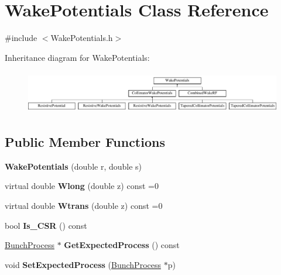 \hypertarget{classWakePotentials}{}\section{Wake\+Potentials Class Reference}
\label{classWakePotentials}


{\ttfamily \#include $<$Wake\+Potentials.\+h$>$}

Inheritance diagram for Wake\+Potentials\+:\begin{figure}[H]
\begin{center}
\leavevmode
\includegraphics[height=1.898305cm]{classWakePotentials}
\end{center}
\end{figure}
\subsection*{Public Member Functions}
\begin{DoxyCompactItemize}
\item 
\mbox{\label{classWakePotentials_a8a60c2f4a9e7edd4d92ce08b572a2534}} 
{\bfseries Wake\+Potentials} (double r, double s)
\item 
\mbox{\label{classWakePotentials_aa016a1abfdb88720c1342572a630271d}} 
virtual double {\bfseries Wlong} (double z) const =0
\item 
\mbox{\label{classWakePotentials_a72ac725b39f1505d35e08b2575354b43}} 
virtual double {\bfseries Wtrans} (double z) const =0
\item 
\mbox{\label{classWakePotentials_a53bb1ca5a2c9e3bbeb92ed09f00e5ecb}} 
bool {\bfseries Is\+\_\+\+C\+SR} () const
\item 
\mbox{\label{classWakePotentials_a3081f53b237908cac75506e18ea5e128}} 
\hyperlink{classBunchProcess}{Bunch\+Process} $\ast$ {\bfseries Get\+Expected\+Process} () const
\item 
\mbox{\label{classWakePotentials_a95f1a3ad1e385f3f25154a20f811b05f}} 
void {\bfseries Set\+Expected\+Process} (\hyperlink{classBunchProcess}{Bunch\+Process} $\ast$p)
\end{DoxyCompactItemize}
